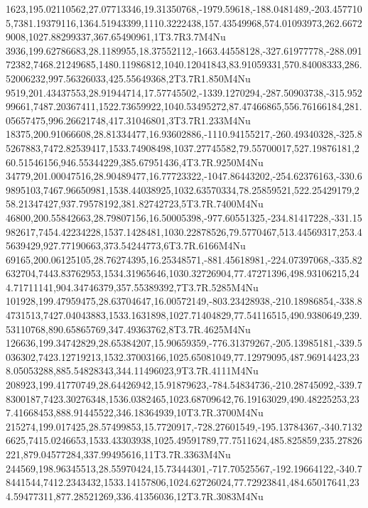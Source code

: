 1623,195.02110562,27.07713346,19.31350768,-1979.59618,-188.0481489,-203.4577105,7381.19379116,1364.51943399,1110.3222438,157.43549968,574.01093973,262.66729008,1027.88299337,367.65490961,1T3.7R3.7M4Nu
3936,199.62786683,28.1189955,18.37552112,-1663.44558128,-327.61977778,-288.09172382,7468.21249685,1480.11986812,1040.12041843,83.91059331,570.84008333,286.52006232,997.56326033,425.55649368,2T3.7R1.850M4Nu
9519,201.43437553,28.91944714,17.57745502,-1339.1270294,-287.50903738,-315.95299661,7487.20367411,1522.73659922,1040.53495272,87.47466865,556.76166184,281.05657475,996.26621748,417.31046801,3T3.7R1.233M4Nu
18375,200.91066608,28.81334477,16.93602886,-1110.94155217,-260.49340328,-325.85267883,7472.82539417,1533.74908498,1037.27745582,79.55700017,527.19876181,260.51546156,946.55344229,385.67951436,4T3.7R.9250M4Nu
34779,201.00047516,28.90489477,16.77723322,-1047.86443202,-254.62376163,-330.69895103,7467.96650981,1538.44038925,1032.63570334,78.25859521,522.25429179,258.21347427,937.79578192,381.82742723,5T3.7R.7400M4Nu
46800,200.55842663,28.79807156,16.50005398,-977.60551325,-234.81417228,-331.15982617,7454.42234228,1537.1428481,1030.22878526,79.5770467,513.44569317,253.45639429,927.77190663,373.54244773,6T3.7R.6166M4Nu
69165,200.06125105,28.76274395,16.25348571,-881.45618981,-224.07397068,-335.82632704,7443.83762953,1534.31965646,1030.32726904,77.47271396,498.93106215,244.71711141,904.34746379,357.55389392,7T3.7R.5285M4Nu
101928,199.47959475,28.63704647,16.00572149,-803.23428938,-210.18986854,-338.84731513,7427.04043883,1533.1631898,1027.71404829,77.54116515,490.9380649,239.53110768,890.65865769,347.49363762,8T3.7R.4625M4Nu
126636,199.34742829,28.65384207,15.90659359,-776.31379267,-205.13985181,-339.5036302,7423.12719213,1532.37003166,1025.65081049,77.12979095,487.96914423,238.05053288,885.54828343,344.11496023,9T3.7R.4111M4Nu
208923,199.41770749,28.64426942,15.91879623,-784.54834736,-210.28745092,-339.78300187,7423.30276348,1536.0382465,1023.68709642,76.19163029,490.48225253,237.41668453,888.91445522,346.18364939,10T3.7R.3700M4Nu
215274,199.017425,28.57499853,15.7720917,-728.27601549,-195.13784367,-340.71326625,7415.0246653,1533.43303938,1025.49591789,77.7511624,485.825859,235.27826221,879.04577284,337.99495616,11T3.7R.3363M4Nu
244569,198.96345513,28.55970424,15.73444301,-717.70525567,-192.19664122,-340.78441544,7412.2343432,1533.14157806,1024.62726024,77.72923841,484.65017641,234.59477311,877.28521269,336.41356036,12T3.7R.3083M4Nu
